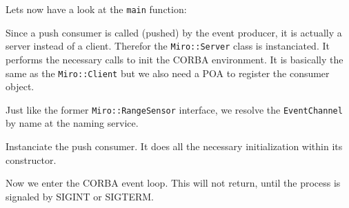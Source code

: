 
\label{lst:SonarNotify2}

Lets now have a look at the \lstinline!main! function:



Since a push consumer is called (pushed) by the event producer, it
is actually a server instead of a client. Therefor the
\lstinline!Miro::Server!  class is instanciated. It performs the
necessary calls to init the CORBA environment. It is basically the
same as the \lstinline!Miro::Client!  but we also need a POA to
register the consumer object.



Just like the former \lstinline!Miro::RangeSensor! interface, we
resolve the \lstinline!EventChannel! by name at the naming service.



Instanciate the push consumer. It does all the necessary
initialization within its constructor.



Now we enter the CORBA event loop. This will not return, until the
process is signaled by SIGINT or SIGTERM.

